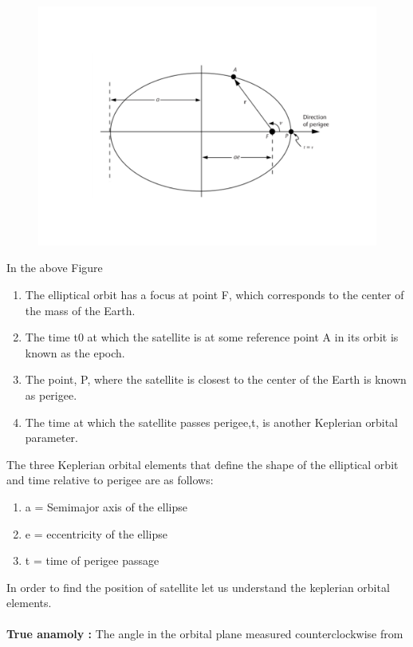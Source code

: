\documentclass[journal,15pt,twocolumn]{IEEEtran}
\begin{document}
\begin{figure}
\includegraphics[scale=0.4]{./figs/1.pdf}
\end{figure}
\vspace{30cm}
In the above Figure 
\begin{enumerate}
\item The elliptical orbit has a focus at point
F, which corresponds to the center of the mass of the Earth.
\item The time t0 at which the satellite is at some
reference point A in its orbit is known as the epoch.
\item The point, P, where the satellite is closest to the center of the Earth
is known as perigee.
\item The time at which the satellite passes perigee,t, is another
Keplerian orbital parameter.
\end{enumerate}
\vspace{5mm}
The three Keplerian orbital elements
that define the shape of the elliptical orbit and time relative to perigee are as
follows: \\
\begin{enumerate}
  \item a = Semimajor axis of the ellipse
  \item e = eccentricity of the ellipse
  \item t = time of perigee passage
\end{enumerate}
In order to find the position of satellite let us understand the keplerian orbital elements.\\
\\
\textbf{True anamoly :} The angle in the orbital plane measured counterclockwise from
\end{document}
